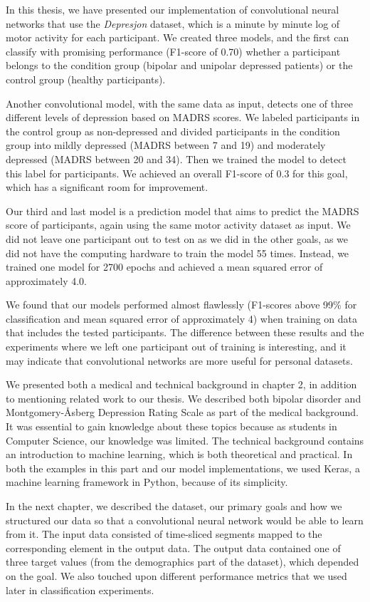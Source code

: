 In this thesis, we have presented our implementation of convolutional neural networks that use the \textit{Depresjon} dataset, which is a minute by minute log of motor activity for each participant. We created three models, and the first can classify with promising performance (F1-score of 0.70) whether a participant belongs to the condition group (bipolar and unipolar depressed patients) or the control group (healthy participants). 

Another convolutional model, with the same data as input, detects one of three different levels of depression based on MADRS scores. We labeled participants in the control group as non-depressed and divided participants in the condition group into mildly depressed (MADRS between 7 and 19) and moderately depressed (MADRS between 20 and 34). Then we trained the model to detect this label for participants. We achieved an overall F1-score of 0.3 for this goal, which has a significant room for improvement.  

Our third and last model is a prediction model that aims to predict the MADRS score of participants, again using the same motor activity dataset as input. We did not leave one participant out to test on as we did in the other goals, as we did not have the computing hardware to train the model 55 times. Instead, we trained one model for 2700 epochs and achieved a mean squared error of approximately 4.0. 

We found that our models performed almost flawlessly (F1-scores above 99\% for classification and mean squared error of approximately 4) when training on data that includes the tested participants. The difference between these results and the experiments where we left one participant out of training is interesting, and it may indicate that convolutional networks are more useful for personal datasets. 

We presented both a medical and technical background in chapter 2, in addition to mentioning related work to our thesis. We described both bipolar disorder and Montgomery-Åsberg Depression Rating Scale as part of the medical background. It was essential to gain knowledge about these topics because as students in Computer Science, our knowledge was limited. The technical background contains an introduction to machine learning, which is both theoretical and practical. In both the examples in this part and our model implementations, we used Keras, a machine learning framework in Python, because of its simplicity. 

In the next chapter, we described the dataset, our primary goals and how we structured our data so that a convolutional neural network would be able to learn from it. The input data consisted of time-sliced segments mapped to the corresponding element in the output data. The output data contained one of three target values (from the demographics part of the dataset), which depended on the goal. We also touched upon different performance metrics that we used later in classification experiments.

